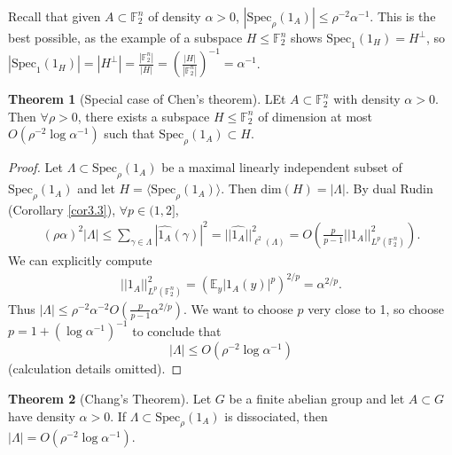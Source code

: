 \documentclass{article}
\theoremstyle{definition}
\newtheorem{theorem}{Theorem}[section]
\begin{document}
Recall that given $A \subset \mathbb{F}_2^n$ of density $\alpha>0$, $\left|\text{Spec}_{\rho}(1_A)\right| \le \rho^{-2}\alpha^{-1}$. This is the best possible, as the example of a subspace $H \le \mathbb{F}_2^n$ shows $\text{Spec}_1(1_H) = H^\perp$, so $\left|\text{Spec}_1(1_H)\right| = \left|H^\perp\right| = \frac{\left|\mathbb{F}_2^n\right|}{\left|H\right|} = \left(\frac{\left|H\right|}{\left|\mathbb{F}_2^n\right|}\right)^{-1} = \alpha^{-1}$.
\begin{theorem}[Special case of Chen's theorem]\label{theorem3.4}
    LEt $A \subset \mathbb{F}_2^n$ with density $\alpha>0$. Then $\forall \rho>0$, there exists a subspace $H \le \mathbb{F}_2^n$ of dimension at most $O \left(\rho^{-2} \log \alpha^{-1}\right)$ such that $\text{Spec}_{\rho}(1_A) \subset H$.
\end{theorem}
\begin{proof}
    Let $\Lambda \subset \text{Spec}_{\rho}(1_A)$ be a maximal linearly independent subset of $\text{Spec}_{\rho}(1_A)$ and let $H = \langle \text{Spec}_\rho (1_A)\rangle$. Then $\text{dim}(H) = \left|\Lambda\right|$. By dual Rudin (Corollary \ref{cor3.3}), $\forall p \in (1,2]$,
    \begin{align*}
        (\rho \alpha)^2 \left|\Lambda\right| \le \sum_{\gamma \in \Lambda}^{} \left|\widehat{1_A}(\gamma)\right|^2 = ||\widehat{1_A}||^2_{\ell^2(\Lambda)} = O \left( \frac{p}{p-1} ||1_A||^2_{L^p(\mathbb{F}_2^n)}\right).
    \end{align*}
    We can explicitly compute 
    \begin{align*}
        ||1_A||^2_{L^p(\mathbb{F}_2^n)} = \left(\mathbb{E}_y |1_A(y)|^p \right)^{2/p} = \alpha^{2/p}.
    \end{align*}
    Thus $\left|\Lambda\right| \le \rho^{-2}\alpha^{-2} O \left(\frac{p}{p-1} \alpha^{2/p}\right)$. We want to choose $p$ very close to 1, so choose $p = 1 + \left(\log \alpha ^{-1}\right)^{-1}$ to conclude that \[
    \left|\Lambda\right|\le O \left(\rho^{-2}\log \alpha^{-1} \right)
    \]
    (calculation details omitted).
\end{proof}
\begin{theorem}[Chang's Theorem]\label{theorem3.6}
    Let $G$ be a finite abelian group and let $A \subset G$ have density $\alpha>0$. If $\Lambda \subset \text{Spec}_{\rho}(1_A)$ is dissociated, then $\left|\Lambda\right| = O \left(\rho^{-2}\log \alpha ^{-1}\right)$.
\end{theorem}
\end{document}
